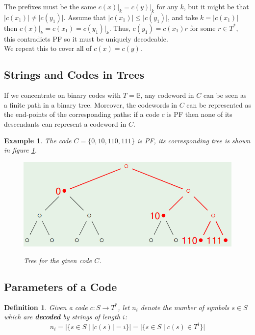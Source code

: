 \documentclass[11pt]{article}
\newtheorem{defn}{Definition}
\newtheorem{eg}{Example}
\begin{document}
The prefixes must be the same $c(x) \rvert_{k} = c(y) \rvert_{k}$ for any $k$, but it might be that $\lvert c(x_1) \rvert \neq \lvert c(y_1) \rvert$.
Assume that $\lvert c(x_1) \rvert \leq \lvert c(y_1) \rvert$, and take $k = \lvert c(x_1) \rvert$ then $c(x) \rvert_{k} = c(x_1) = c(y_1) \rvert_{k}$.
Thus, $c(y_1) = c(x_1) r$ for some $r \in T^*$, this contradicts PF so it must be uniquely decodeable. \\

We repeat this to cover all of $c(x) = c(y)$.

\subsection{Strings and Codes in Trees}
If we concentrate on binary codes with $T = \mathbb{B}$, any codeword in $C$ can be seen as a finite path in a binary tree.
Moreover, the codewords in $C$ can be represented as the end-points of the corresponding paths: if a code $c$ is PF then none of its descendants can represent a codeword in $C$.

\begin{eg}
  The code $C = \{ 0, 10, 110, 111 \}$ is PF, its corresponding tree is shown in figure \ref{fig:treepath}.
  \begin{figure}[h!]
    \caption{Tree for the given code $C$.}
    \centering
    \includegraphics[width=\textwidth]{treepaths}
    \label{fig:treepath}
  \end{figure}
\end{eg}

\subsection{Parameters of a Code}
\begin{defn}
  Given a code $c: S \rightarrow T^*$, let $n_i$ denote the number of symbols $s \in S$ which are \textbf{decoded} by strings of length $i$:
  \[ n_i = \lvert \{ s \in S \mid \lvert c(s) \rvert = i \} \rvert = \lvert \{ s \in S \mid c(s) \in T^i \} \rvert \]
\end{defn}
\end{document}
